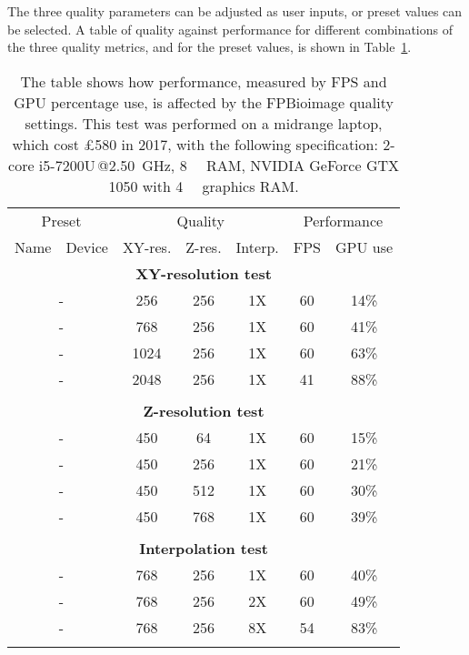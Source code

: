 The three quality parameters can be adjusted as user inputs, or preset values can be selected.
A table of quality against performance for different combinations of the three quality metrics, and for the preset values, is shown in Table~\ref{tab:fpbPerformance}. 

\begin{table}
\caption[FPBioimage: quality and performance]{\label{tab:fpbPerformance}The table shows how performance, measured by FPS and GPU percentage use, is affected by the FPBioimage quality settings. This test was performed on a midrange laptop, which cost £580 in 2017, with the following specification: 2-core i5-7200U\,@\SI{2.50}{\giga\hertz}, \SI{8}{\giga\byte} RAM, NVIDIA GeForce GTX 1050 with \SI{4}{\giga\byte} graphics RAM.}
\begin{tabular}{|l l|c c c|c c|}
\hline
\multicolumn{2}{|c|}{Preset} & \multicolumn{3}{c|}{Quality} & \multicolumn{2}{c|}{Performance} \\
\multicolumn{1}{|c}{Name} & \multicolumn{1}{c|}{Device} & XY-res. & Z-res. & \multicolumn{1}{c|}{Interp.} & FPS & \multicolumn{1}{c|}{GPU use} \\
\hline

\multicolumn{7}{|c|}{\textbf{XY-resolution test}} \\ \hline
\multicolumn{2}{|c|}{-} & 256 & 256 & 1X & 60 & 14\% \\
\multicolumn{2}{|c|}{-} & 768 & 256 & 1X & 60 & 41\% \\
\multicolumn{2}{|c|}{-} & 1024 & 256 & 1X & 60 & 63\% \\
\multicolumn{2}{|c|}{-} & 2048 & 256 & 1X & 41 & 88\% \\
 & & & & & & \\
\hline

\multicolumn{7}{|c|}{\textbf{Z-resolution test}} \\ \hline
\multicolumn{2}{|c|}{-} & 450 & 64 & 1X & 60 & 15\% \\
\multicolumn{2}{|c|}{-} & 450 & 256 & 1X & 60 & 21\% \\
\multicolumn{2}{|c|}{-} & 450 & 512 & 1X & 60 & 30\% \\
\multicolumn{2}{|c|}{-} & 450 & 768 & 1X & 60 & 39\% \\
 & & & & & & \\
\hline

\multicolumn{7}{|c|}{\textbf{Interpolation test}} \\ \hline
\multicolumn{2}{|c|}{-} & 768 & 256 & 1X & 60 & 40\% \\
\multicolumn{2}{|c|}{-} & 768 & 256 & 2X & 60 & 49\% \\
\multicolumn{2}{|c|}{-} & 768 & 256 & 8X & 54 & 83\% \\
 & & & & & & \\
\hline


\end{tabular}
\end{table}
